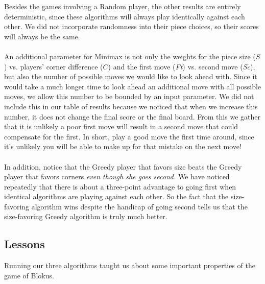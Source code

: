 \documentclass[11pt]{article}
\begin{document}
\noindent Besides the games involving a Random player, the other results are entirely deterministic, since these algorithms will always play identically against each other. We did not incorporate randomness into their piece choices, so their scores will always be the same.
\\\\
An additional parameter for Minimax is not only the weights for the piece size ($S$) vs. players' corner difference ($C$) and the first move ({\it Ft}) vs. second move ({\it Sc}), but also the number of possible moves we would like to look ahead with. Since it would take a much longer time to look ahead an additional move with all possible moves, we allow this number to be bounded by an input parameter. We did not include this in our table of results because we noticed that when we increase this number, it does not change the final score or the final board. From this we gather that it is unlikely a poor first move will result in a second move that could compensate for the first. In short, play a good move the first time around, since it's unlikely you will be able to make up for that mistake on the next move!
\\\\
In addition, notice that the Greedy player that favors size beats the Greedy player that favors corners {\it even though she goes second.} We have noticed repeatedly that there is about a three-point advantage to going first when identical algorithms are playing against each other. So the fact that the size-favoring algorithm wins despite the handicap of going second tells us that the size-favoring Greedy algorithm is truly much better.

\subsection{Lessons}

Running our three algorithms taught us about some important properties of the game of Blokus.
\end{document}
